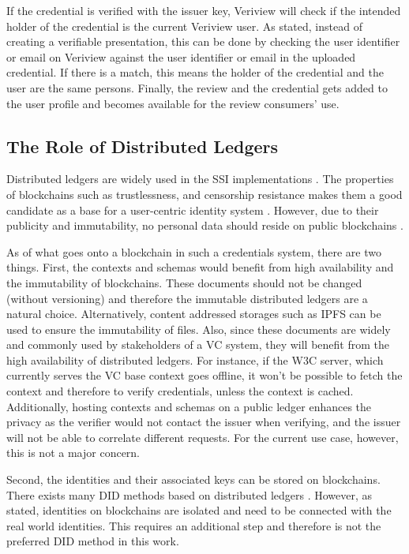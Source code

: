 If the credential is verified with the issuer key, Veriview will check if the intended holder of the credential is the current Veriview user. As stated, instead of creating a verifiable presentation, this can be done by checking the user identifier or email on Veriview against the user identifier or email in the uploaded credential. If there is a match, this means the holder of the credential and the user are the same persons. Finally, the review and the credential gets added to the user profile and becomes available for the review consumers' use.

\subsection{The Role of Distributed Ledgers}

Distributed ledgers are widely used in the \acrshort{SSI} implementations \parencite{vanBokkem.29Nis2019}. The properties of blockchains such as trustlessness, and censorship resistance \parencite{DiFrancescoMaesa.2020} makes them a good candidate as a base for a user-centric identity system \parencite{cameron2009appendix}.
However, due to their publicity and immutability, no personal data should reside on public blockchains \parencite{blockchain-gdpr}. 

As of what goes onto a blockchain in such a credentials system, there are two things. First, the contexts and schemas would benefit from high availability and the immutability of blockchains. These documents should not be changed (without versioning) and therefore the immutable distributed ledgers are a natural choice. Alternatively, content addressed storages such as \acrshort{IPFS} can be used to ensure the immutability of files. Also, since these documents are widely and commonly used by stakeholders of a \acrshort{VC} system, they will benefit from the high availability of distributed ledgers. For instance, if the \acrshort{W3C} server, which currently serves the \acrshort{VC} base context goes offline, it won't be possible to fetch the context and therefore to verify credentials, unless the context is cached. Additionally, hosting contexts and schemas on a public ledger enhances the privacy as the verifier would not contact the issuer when verifying, and the issuer will not be able to correlate different requests. For the current use case, however, this is not a major concern. 

Second, the identities and their associated keys can be stored on blockchains. There exists many \acrshort{DID} methods based on distributed ledgers \parencite{did-spec-registry}. However, as stated, identities on blockchains are isolated and need to be connected with the real world identities. This requires an additional step and therefore is not the preferred \acrshort{DID} method in this work. 











